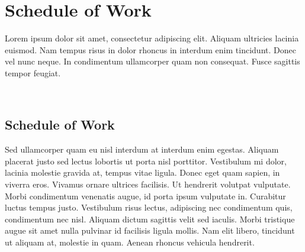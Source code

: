 \chapter{Schedule of Work}
\label{Chapter3} %


\noindent Lorem ipsum dolor sit amet, consectetur adipiscing elit. Aliquam ultricies lacinia euismod. Nam tempus risus in dolor rhoncus in interdum enim tincidunt. Donec vel nunc neque. In condimentum ullamcorper quam non consequat. Fusce sagittis tempor feugiat. 

\par\vspace{0.5cm}
\noindent {}\\


\section{Schedule of Work}

Sed ullamcorper quam eu nisl interdum at interdum enim egestas. Aliquam placerat justo sed lectus lobortis ut porta nisl porttitor. Vestibulum mi dolor, lacinia molestie gravida at, tempus vitae ligula. Donec eget quam sapien, in viverra eros. Vivamus ornare ultrices facilisis. Ut hendrerit volutpat vulputate. Morbi condimentum venenatis augue, id porta ipsum vulputate in. Curabitur luctus tempus justo. Vestibulum risus lectus, adipiscing nec condimentum quis, condimentum nec nisl. Aliquam dictum sagittis velit sed iaculis. Morbi tristique augue sit amet nulla pulvinar id facilisis ligula mollis. Nam elit libero, tincidunt ut aliquam at, molestie in quam. Aenean rhoncus vehicula hendrerit. \par 
\medskip


